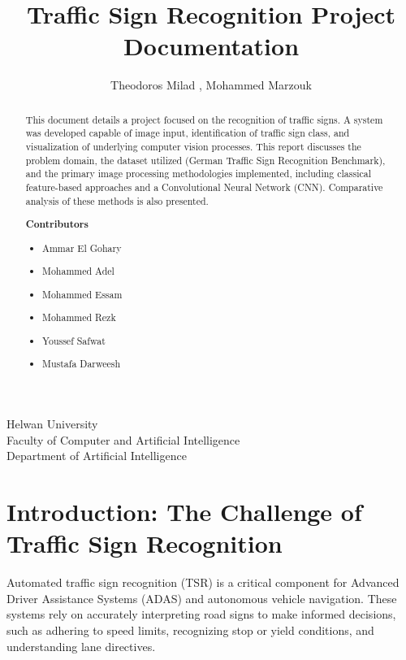 \documentclass[11pt, a4paper]{article}
\title{Traffic Sign Recognition Project Documentation}
\author{Theodoros Milad , Mohammed Marzouk}
\newcommand{\universityinfo}{
    \begin{center}
        \large Helwan University\\
        Faculty of Computer and Artificial Intelligence\\
        Department of Artificial Intelligence
    \end{center}
}
\begin{document}
\maketitle
\universityinfo

\begin{abstract}
This document details a project focused on the recognition of traffic signs. A system was developed capable of image input, identification of traffic sign class, and visualization of underlying computer vision processes. This report discusses the problem domain, the dataset utilized (German Traffic Sign Recognition Benchmark), and the primary image processing methodologies implemented, including classical feature-based approaches and a Convolutional Neural Network (CNN). Comparative analysis of these methods is also presented.

\vspace{1em}
\begin{center}
\textbf{Contributors}
\begin{itemize}[noitemsep, topsep=1pt, align=center]
\item  Ammar El Gohary
\item  Mohammed Adel
\item Mohammed Essam
\item Mohammed Rezk 
\item Youssef Safwat
\item Mustafa Darweesh
\end{itemize}
\end{center}
\end{abstract}

\clearpage
\tableofcontents
\clearpage

\section{Introduction: The Challenge of Traffic Sign Recognition}

Automated traffic sign recognition (TSR) is a critical component for Advanced Driver Assistance Systems (ADAS) and autonomous vehicle navigation. These systems rely on accurately interpreting road signs to make informed decisions, such as adhering to speed limits, recognizing stop or yield conditions, and understanding lane directives.
\end{document}
